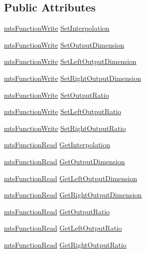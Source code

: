 \subsection*{Public Attributes}
\begin{DoxyCompactItemize}
\item 
\hyperlink{classmts_function_write}{mts\-Function\-Write} \hyperlink{class_i_req_filter_image_resizer_a7c4a8f8578b8869d52d01c5b49d539d8}{Set\-Interpolation}
\item 
\hyperlink{classmts_function_write}{mts\-Function\-Write} \hyperlink{class_i_req_filter_image_resizer_a1f750013b1cc498c12b85635620daeba}{Set\-Output\-Dimension}
\item 
\hyperlink{classmts_function_write}{mts\-Function\-Write} \hyperlink{class_i_req_filter_image_resizer_a69b15318ca531eecd5b0e895c1c6fca5}{Set\-Left\-Output\-Dimension}
\item 
\hyperlink{classmts_function_write}{mts\-Function\-Write} \hyperlink{class_i_req_filter_image_resizer_a7aa158be40abd90f5bff2f0f000a80e9}{Set\-Right\-Output\-Dimension}
\item 
\hyperlink{classmts_function_write}{mts\-Function\-Write} \hyperlink{class_i_req_filter_image_resizer_ae407fe4ae2ad3ff0c50f113145b40811}{Set\-Output\-Ratio}
\item 
\hyperlink{classmts_function_write}{mts\-Function\-Write} \hyperlink{class_i_req_filter_image_resizer_a115b520fe839eb342a084200e1952e2f}{Set\-Left\-Output\-Ratio}
\item 
\hyperlink{classmts_function_write}{mts\-Function\-Write} \hyperlink{class_i_req_filter_image_resizer_af77849e0dac81b2ae79f64eed2485a2c}{Set\-Right\-Output\-Ratio}
\item 
\hyperlink{classmts_function_read}{mts\-Function\-Read} \hyperlink{class_i_req_filter_image_resizer_af0c7b4eb059b122716e34ef51bb3568b}{Get\-Interpolation}
\item 
\hyperlink{classmts_function_read}{mts\-Function\-Read} \hyperlink{class_i_req_filter_image_resizer_a7922ac938697dc3b76efbba17edab292}{Get\-Output\-Dimension}
\item 
\hyperlink{classmts_function_read}{mts\-Function\-Read} \hyperlink{class_i_req_filter_image_resizer_a65dbb99358f14b6cf68dbf37115ed641}{Get\-Left\-Output\-Dimension}
\item 
\hyperlink{classmts_function_read}{mts\-Function\-Read} \hyperlink{class_i_req_filter_image_resizer_a8010246d528fead6f1e145aadbd77459}{Get\-Right\-Output\-Dimension}
\item 
\hyperlink{classmts_function_read}{mts\-Function\-Read} \hyperlink{class_i_req_filter_image_resizer_a85fa3c75de703949a530dfb649962594}{Get\-Output\-Ratio}
\item 
\hyperlink{classmts_function_read}{mts\-Function\-Read} \hyperlink{class_i_req_filter_image_resizer_ab80ab30199a41a4bff2ed40dd8326061}{Get\-Left\-Output\-Ratio}
\item 
\hyperlink{classmts_function_read}{mts\-Function\-Read} \hyperlink{class_i_req_filter_image_resizer_a74cd2f32abb987969a3cfc0787af937a}{Get\-Right\-Output\-Ratio}
\end{DoxyCompactItemize}


